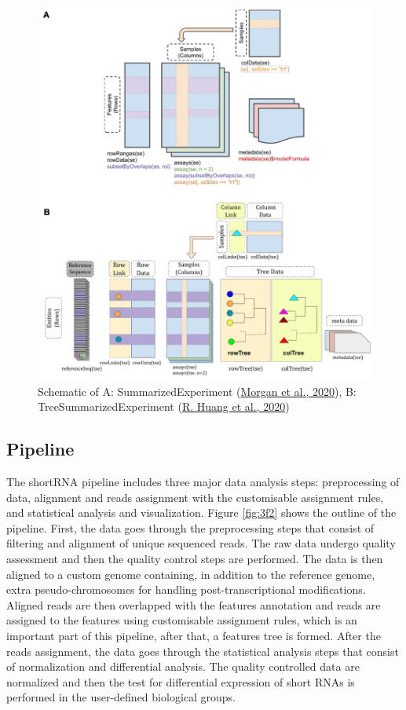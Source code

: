 \documentclass[12pt,twoside]{reedthesis}
\begin{document}
\begin{figure}[h]

{\centering \includegraphics{thesis_files/figure-latex/3f1-1} 

}

\caption{Schematic of A: SummarizedExperiment (\protect\hyperlink{ref-morgan2020}{Morgan et al., 2020}), B: TreeSummarizedExperiment (\protect\hyperlink{ref-huang2020}{R. Huang et al., 2020})}\label{fig:3f1}
\end{figure}
\hypertarget{pipeline}{%
\subsection{Pipeline}\label{pipeline}}

The shortRNA pipeline includes three major data analysis steps:
preprocessing of data, alignment and reads assignment with the
customisable assignment rules, and statistical analysis and
visualization. Figure \ref{fig:3f2} shows the outline of the pipeline. First, the
data goes through the preprocessing steps that consist of filtering and
alignment of unique sequenced reads. The raw data undergo quality
assessment and then the quality control steps are performed. The data is
then aligned to a custom genome containing, in addition to the reference
genome, extra pseudo-chromosomes for handling post-transcriptional
modifications. Aligned reads are then overlapped with the features
annotation and reads are assigned to the features using customisable
assignment rules, which is an important part of this pipeline, after
that, a features tree is formed. After the reads assignment, the data
goes through the statistical analysis steps that consist of
normalization and differential analysis. The quality controlled data are
normalized and then the test for differential expression of short RNAs
is performed in the user-defined biological groups.
\end{document}
